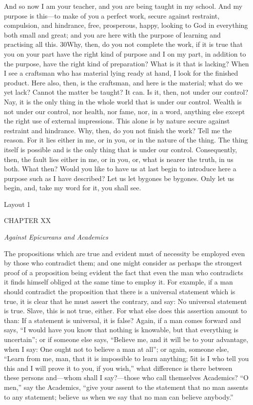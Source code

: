 And so now I am your teacher, and you are being taught in my school. And my purpose is this—to make of you a perfect work, secure against restraint, compulsion, and hindrance, free, prosperous, happy, looking to God in everything both small and great; and you are here with the purpose of learning and practising all this. 30Why, then, do you not complete the work, if it is true that you on your part have the right kind of purpose and I on my part, in addition to the purpose, have the right kind of preparation? What is it that is lacking? When I see a craftsman who has material lying ready at hand, I look for the finished product. Here also, then, is the craftsman, and here is the material; what do we yet lack? Cannot the matter be taught? It can. Is it, then, not under our control? Nay, it is the only thing in the whole world that is under our control. Wealth is not under our control, nor health, nor fame, nor, in a word, anything else except the right use of external impressions. This alone is by nature secure against restraint and hindrance. Why, then, do you not finish the work? Tell me the reason. For it lies either in me, or in you, or in the nature of the thing. The thing itself is possible and is the only thing that is under our control. Consequently, then, the fault lies either in me, or in you, or, what is nearer the truth, in us both. What then? Would you like to have us at last begin to introduce here a purpose such as I have described? Let us let bygones be bygones. Only let us begin, and, take my word for it, you shall see.



Layout 1

CHAPTER XX

\emph{Against Epicureans and Academics}

The propositions which are true and evident must of necessity be employed even by those who contradict them; and one might consider as perhaps the strongest proof of a proposition being evident the fact that even the man who contradicts it finds himself obliged at the same time to employ it. For example, if a man should contradict the proposition that there is a universal statement which is true, it is clear that he must assert the contrary, and say: No universal statement is true. Slave, this is not true, either. For what else does this assertion amount to than: If a statement is universal, it is false? Again, if a man comes forward and says, ``I would have you know that nothing is knowable, but that everything is uncertain''; or if someone else says, ``Believe me, and it will be to your advantage, when I say: One ought not to believe a man at all''; or again, someone else, ``Learn from me, man, that it is impossible to learn anything; 5it is I who tell you this and I will prove it to you, if you wish,'' what difference is there between these persons and—whom shall I say?—those who call themselves Academics? ``O men,'' say the Academics, ``give your assent to the statement that no man assents to any statement; believe \emph{us} when we say that no man can believe anybody.''

